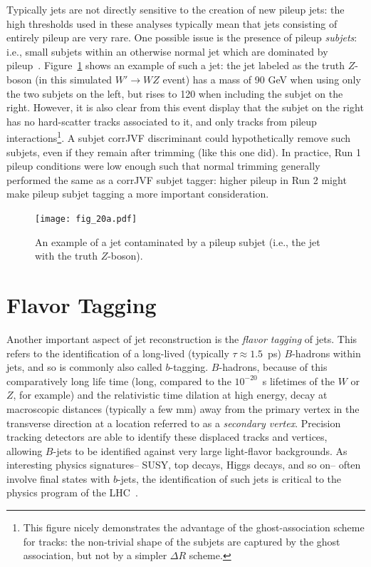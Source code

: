 Typically \largeR jets are not directly sensitive to the creation of new pileup jets: the high \pt thresholds used in these analyses typically mean that jets consisting of entirely pileup are very rare. One possible issue is the presence of pileup \textit{subjets}: i.e., small subjets within an otherwise normal \largeR jet which are dominated by pileup~\cite{ATLAS-JVT}. Figure~\ref{fig:jet-reconstruction:pu_subjet} shows an example of such a jet: the \largeR jet labeled as the truth $Z$-boson (in this simulated $W'\rightarrow WZ$ event) has a mass of 90 GeV when using only the two subjets on the left, but rises to 120 when including the subjet on the right. However, it is also clear from this event display that the subjet on the right has no hard-scatter tracks associated to it, and only tracks from pileup interactions\footnote{This figure nicely demonstrates the advantage of the ghost-association scheme for tracks: the non-trivial shape of the \kt subjets are captured by the ghost association, but not by a simpler $\Delta R$ scheme.}. A subjet corrJVF discriminant could hypothetically remove such subjets, even if they remain after trimming (like this one did). In practice, Run 1 pileup conditions were low enough such that normal trimming generally performed the same as a corrJVF subjet tagger: higher pileup in Run 2 might make pileup subjet tagging a more important consideration.


\begin{figure}
\centering
\texttt{[image: fig\_20a.pdf]}
\label{fig:jet-reconstruction:pu_subjet}
\caption{An example of a jet contaminated by a pileup subjet (i.e., the \largeR jet with the truth $Z$-boson).}
\end{figure}

\section{Flavor Tagging}

Another important aspect of jet reconstruction is the \textit{flavor tagging} of jets.  This refers to the identification of a long-lived (typically $\tau \approx 1.5$~ps) $B$-hadrons within jets, and so is commonly also called $b$-tagging. $B$-hadrons, because of this comparatively long life time (long, compared to the $10^{-20}$~s lifetimes of the $W$ or $Z$, for example) and the relativistic time dilation at high energy, decay at macroscopic distances (typically a few mm) away from the primary vertex in the transverse direction at a location referred to as a \textit{secondary vertex}. Precision tracking detectors are able to identify these displaced tracks and vertices, allowing $B$-jets to be identified against very large light-flavor backgrounds. As interesting physics signatures-- SUSY, top decays, Higgs decays, and so on-- often involve final states with $b$-jets, the identification of such jets is critical to the physics program of the LHC~\cite{ATLAS-B}.

